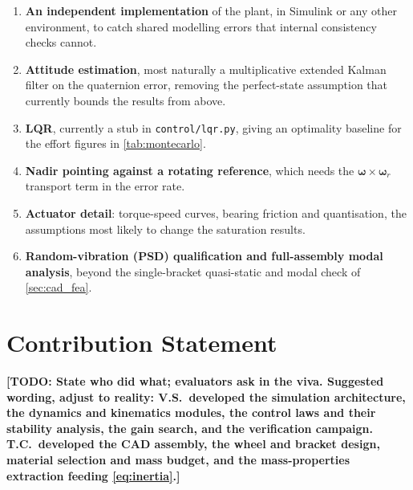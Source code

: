 \documentclass[conference,10pt,a4paper]{IEEEtran}
\newcommand{\TODO}[1]{\textbf{[TODO: #1]}}
\newcommand{\TODO}[1]{}
\newcommand{\vect}[1]{\bm{#1}}
\begin{document}
\begin{enumerate}
\item \textbf{An independent implementation} of the plant, in Simulink or any
other environment, to catch shared modelling errors that internal consistency
checks cannot.
\item \textbf{Attitude estimation}, most naturally a multiplicative extended
Kalman filter on the quaternion error, removing the perfect-state assumption
that currently bounds the results from above.
\item \textbf{LQR}, currently a stub in \texttt{control/lqr.py}, giving an
optimality baseline for the effort figures in \cref{tab:montecarlo}.
\item \textbf{Nadir pointing against a rotating reference}, which needs the
$\vect{\omega}\times\vect{\omega}_r$ transport term in the error rate.
\item \textbf{Actuator detail}: torque-speed curves, bearing friction and
quantisation, the assumptions most likely to change the saturation results.
\item \textbf{Random-vibration (PSD) qualification and full-assembly modal
analysis}, beyond the single-bracket quasi-static and modal check of
\cref{sec:cad_fea}.
\end{enumerate}

\section*{Contribution Statement}

\TODO{State who did what; evaluators ask in the viva. Suggested wording, adjust
to reality: V.S.\ developed the simulation architecture, the dynamics and
kinematics modules, the control laws and their stability analysis, the gain
search, and the verification campaign. T.C.\ developed the CAD assembly, the
wheel and bracket design, material selection and mass budget, and the
mass-properties extraction feeding \cref{eq:inertia}.}
\end{document}
